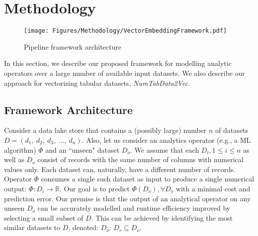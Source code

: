 \section{Methodology}

\begin{figure*}[!htbp]
    \centering
    \captionsetup{justification=centering}
    \texttt{[image: Figures/Methodology/VectorEmbeddingFramework.pdf]}
    \caption{Pipeline framework architecture}
    \label{fig:fig-method1}
\end{figure*}

In this section, we describe our proposed framework for modelling analytic operators over a large number of available input datasets. We also describe our approach for vectorizing tabular datasets, \emph{NumTabData2Vec}.

\subsection{Framework Architecture}

Consider a data lake store that contains a (possibly large) number $n$ of datasets $D = \left( d_1,\ d_2,\ d_3,\ \ldots,\ d_n\right)$. Also, let us consider an analytics operator (e.g., a ML algorithm) $\Phi$ and an ``unseen" dataset $D_o$. We assume that each $D_i, 1 \leq i \leq n $ as well as $D_o$ consist of records with the same number of columns with numerical values only. Each dataset can, naturally, have a different number of records. Operator $\Phi$ consumes a single such dataset as input to produce a single numerical output: $\Phi: D_i \rightarrow \mathbb{R}$. 
Our goal is to predict $\Phi(D_o), \forall D_o$ with a minimal cost and prediction error. Our premise is that the output of an analytical operator on any unseen $D_o$ can be accurately modelled and runtime efficiency improved by selecting a small subset of $D$. This can be achieved by identifying the most similar datasets to $D$, denoted: $D_o$: $D_r\subseteq D_o$.
 
